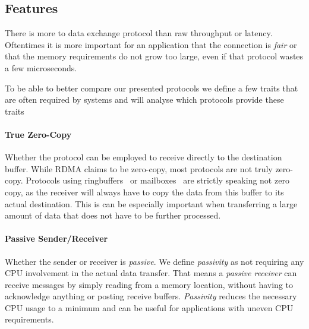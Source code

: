 


\pagebreak
\subsection{Features}

There is more to data exchange protocol than raw throughput or latency. Oftentimes it is more important for an application
that the connection is \emph{fair} or that the memory requirements do not grow too large, even if that protocol wastes
a few microseconds.

To be able to better compare our presented protocols we define a few traits that are often required by systems and will 
analyse which protocols provide these traits

\paragraph{True Zero-Copy} Whether the protocol can be employed to receive directly to the destination buffer. While RDMA 
claims to be zero-copy, most protocols are not truly zero-copy. Protocols using ringbuffers~\cite{} or mailboxes~\cite{} are
strictly speaking not zero copy, as the receiver will always have to copy the data from this buffer to its actual destination.
This is can be especially important when transferring a large amount of data that does not have to be further processed.

\paragraph{Passive Sender/Receiver} Whether the sender or receiver is \emph{passive}. We define \emph{passivity} as not 
requiring any CPU involvement in the actual data transfer. That means a \emph{passive receiver} can receive messages by
simply reading from a memory location, without having to acknowledge anything or posting receive buffers. \emph{Passivity} 
reduces the necessary CPU usage to a minimum and can be useful for applications with uneven CPU requirements.

